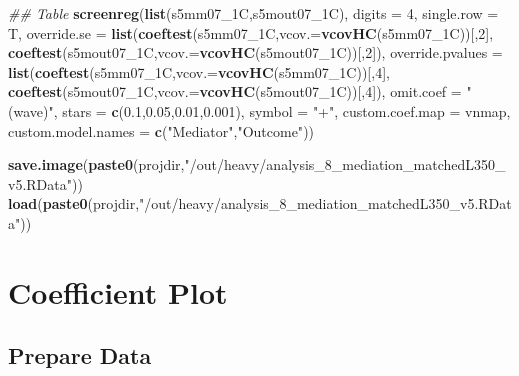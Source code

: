 \documentclass[
]{article}
\newenvironment{Shaded}{\begin{snugshade}}{\end{snugshade}}
\newcommand{\CommentTok}[1]{\textcolor[rgb]{0.56,0.35,0.01}{\textit{#1}}}
\newcommand{\DataTypeTok}[1]{\textcolor[rgb]{0.13,0.29,0.53}{#1}}
\newcommand{\DecValTok}[1]{\textcolor[rgb]{0.00,0.00,0.81}{#1}}
\newcommand{\FloatTok}[1]{\textcolor[rgb]{0.00,0.00,0.81}{#1}}
\newcommand{\KeywordTok}[1]{\textcolor[rgb]{0.13,0.29,0.53}{\textbf{#1}}}
\newcommand{\NormalTok}[1]{#1}
\newcommand{\StringTok}[1]{\textcolor[rgb]{0.31,0.60,0.02}{#1}}
\begin{document}
\begin{Shaded}
\begin{Highlighting}[]
\CommentTok{## Table}
\KeywordTok{screenreg}\NormalTok{(}\KeywordTok{list}\NormalTok{(s5mm07_1C,s5mout07_1C), }\DataTypeTok{digits =} \DecValTok{4}\NormalTok{, }\DataTypeTok{single.row =}\NormalTok{ T,}
          \DataTypeTok{override.se =} \KeywordTok{list}\NormalTok{(}\KeywordTok{coeftest}\NormalTok{(s5mm07_1C,}\DataTypeTok{vcov.=}\KeywordTok{vcovHC}\NormalTok{(s5mm07_1C))[,}\DecValTok{2}\NormalTok{],}
                             \KeywordTok{coeftest}\NormalTok{(s5mout07_1C,}\DataTypeTok{vcov.=}\KeywordTok{vcovHC}\NormalTok{(s5mout07_1C))[,}\DecValTok{2}\NormalTok{]),}
          \DataTypeTok{override.pvalues =} \KeywordTok{list}\NormalTok{(}\KeywordTok{coeftest}\NormalTok{(s5mm07_1C,}\DataTypeTok{vcov.=}\KeywordTok{vcovHC}\NormalTok{(s5mm07_1C))[,}\DecValTok{4}\NormalTok{],}
                                  \KeywordTok{coeftest}\NormalTok{(s5mout07_1C,}\DataTypeTok{vcov.=}\KeywordTok{vcovHC}\NormalTok{(s5mout07_1C))[,}\DecValTok{4}\NormalTok{]),}
          \DataTypeTok{omit.coef =} \StringTok{"(wave)"}\NormalTok{, }\DataTypeTok{stars =} \KeywordTok{c}\NormalTok{(}\FloatTok{0.1}\NormalTok{,}\FloatTok{0.05}\NormalTok{,}\FloatTok{0.01}\NormalTok{,}\FloatTok{0.001}\NormalTok{), }\DataTypeTok{symbol =} \StringTok{"+"}\NormalTok{,}
          \DataTypeTok{custom.coef.map =}\NormalTok{ vnmap, }
          \DataTypeTok{custom.model.names =} \KeywordTok{c}\NormalTok{(}\StringTok{"Mediator"}\NormalTok{,}\StringTok{"Outcome"}\NormalTok{))}
\end{Highlighting}
\end{Shaded}

\begin{Shaded}
\begin{Highlighting}[]
\KeywordTok{save.image}\NormalTok{(}\KeywordTok{paste0}\NormalTok{(projdir,}\StringTok{"/out/heavy/analysis_8_mediation_matchedL350_v5.RData"}\NormalTok{))}
\KeywordTok{load}\NormalTok{(}\KeywordTok{paste0}\NormalTok{(projdir,}\StringTok{"/out/heavy/analysis_8_mediation_matchedL350_v5.RData"}\NormalTok{))}
\end{Highlighting}
\end{Shaded}

\hypertarget{coefficient-plot}{%
\section{Coefficient Plot}\label{coefficient-plot}}

\hypertarget{prepare-data}{%
\subsection{Prepare Data}\label{prepare-data}}
\end{document}
